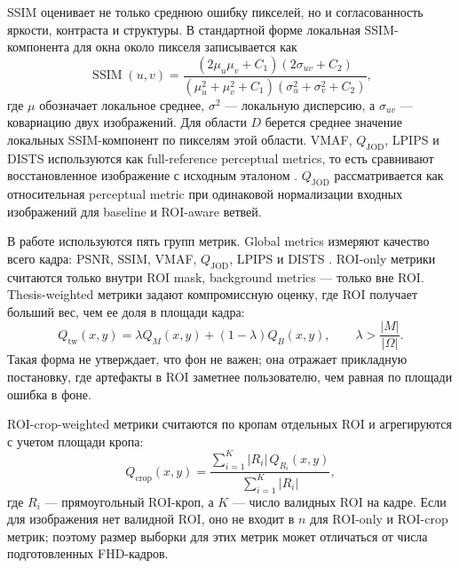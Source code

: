 \documentclass[12pt,a4paper,oneside,openany]{report}
\begin{document}
SSIM оценивает не только среднюю ошибку пикселей, но и согласованность яркости, контраста и
структуры. В стандартной форме локальная SSIM-компонента для окна около пикселя записывается как
\begin{equation}
  \operatorname{SSIM}(u,v)=
  \frac{(2\mu_u\mu_v+C_1)(2\sigma_{uv}+C_2)}
       {(\mu_u^2+\mu_v^2+C_1)(\sigma_u^2+\sigma_v^2+C_2)},
  \label{eq:ssim_local}
\end{equation}
где $\mu$ обозначает локальное среднее, $\sigma^2$ --- локальную дисперсию, а $\sigma_{uv}$ ---
ковариацию двух изображений. Для области $D$ берется среднее значение локальных SSIM-компонент
по пикселям этой области. VMAF, $Q_{\mathrm{JOD}}$, LPIPS и DISTS используются как
full-reference perceptual metrics, то есть сравнивают восстановленное изображение с исходным
эталоном \cite{vmaf,lpips,dists,fovvideovdp}. $Q_{\mathrm{JOD}}$ рассматривается как
относительная perceptual metric при одинаковой нормализации входных изображений для baseline и
ROI-aware ветвей.

В работе используются пять групп метрик. Global metrics измеряют качество всего кадра:
PSNR, SSIM, VMAF, $Q_{\mathrm{JOD}}$, LPIPS и DISTS \cite{psnr,ssim}. ROI-only метрики считаются
только внутри ROI mask, background metrics --- только вне ROI. Thesis-weighted метрики задают
компромиссную оценку, где ROI получает больший вес, чем ее доля в площади кадра:
\begin{equation}
  Q_{\mathrm{tw}}(x,y)
  =
  \lambda Q_{M}(x,y) + (1-\lambda)Q_{B}(x,y),
  \qquad
  \lambda > \frac{|M|}{|\Omega|}.
  \label{eq:thesis_weighted}
\end{equation}
Такая форма не утверждает, что фон не важен; она отражает прикладную постановку, где артефакты
в ROI заметнее пользователю, чем равная по площади ошибка в фоне.

ROI-crop-weighted метрики считаются по кропам отдельных ROI и агрегируются с учетом площади
кропа:
\begin{equation}
  Q_{\mathrm{crop}}(x,y)
  =
  \frac{\sum_{i=1}^{K}|R_i|\,Q_{R_i}(x,y)}
       {\sum_{i=1}^{K}|R_i|},
  \label{eq:roi_crop_weighted}
\end{equation}
где $R_i$ --- прямоугольный ROI-кроп, а $K$ --- число валидных ROI на кадре. Если для изображения
нет валидной ROI, оно не входит в $n$ для ROI-only и ROI-crop метрик; поэтому размер выборки для
этих метрик может отличаться от числа подготовленных FHD-кадров.
\end{document}

